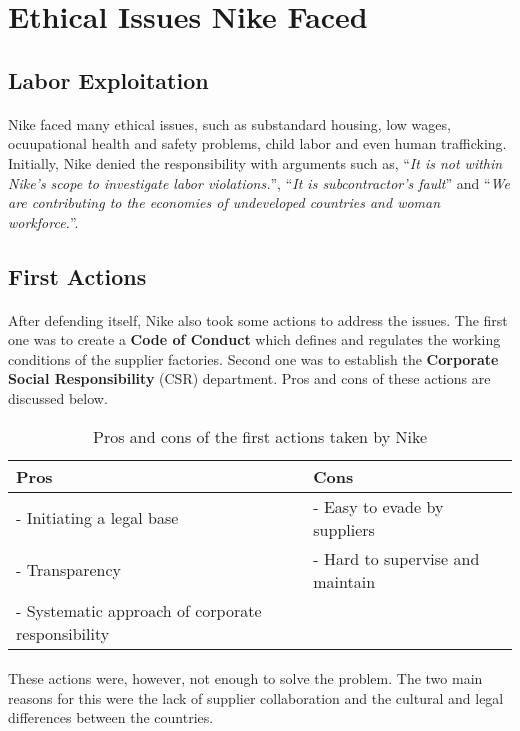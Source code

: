 \section{Ethical Issues Nike Faced}

\subsection{Labor Exploitation}

\paragraph{} Nike faced many ethical issues, such as substandard housing, low wages, ocuupational health and safety problems, child labor and even human trafficking. Initially, Nike denied the responsibility with arguments such as, \enquote{\textit{It is not within Nike’s scope to investigate labor violations.}}, \enquote{\textit{It is subcontractor's fault}} and \enquote{\textit{We are contributing to the economies of undeveloped countries and woman workforce.}}. 

\subsection{First Actions}

\paragraph{} After defending itself, Nike also took some actions to address the issues. The first one was to create a \textbf{Code of Conduct} which defines and regulates the working conditions of the supplier factories. Second one was to establish the \textbf{Corporate Social Responsibility} (CSR) department. Pros and cons of these actions are discussed below.

\begin{table}[H]
    \centering
    \begin{tabular}{|l|l|}
        \hline
        Pros & Cons \\
        \hline
        - Initiating a legal base & - Easy to evade by suppliers \\
        - Transparency & - Hard to supervise and maintain \\
        - Systematic approach of corporate responsibility & \\
        \hline
    \end{tabular}
    \caption{Pros and cons of the first actions taken by Nike}
    \label{tab:first-actions}
\end{table}

\paragraph{} These actions were, however, not enough to solve the problem. The two main reasons for this were the lack of supplier collaboration and the cultural and legal differences between the countries.
